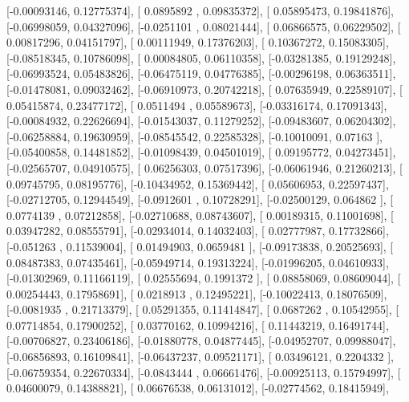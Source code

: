 \documentclass{article}
\begin{document}
       [-0.00093146,  0.12775374],
       [ 0.0895892 ,  0.09835372],
       [ 0.05895473,  0.19841876],
       [-0.06998059,  0.04327096],
       [-0.0251101 ,  0.08021444],
       [ 0.06866575,  0.06229502],
       [ 0.00817296,  0.04151797],
       [ 0.00111949,  0.17376203],
       [ 0.10367272,  0.15083305],
       [-0.08518345,  0.10786098],
       [ 0.00084805,  0.06110358],
       [-0.03281385,  0.19129248],
       [-0.06993524,  0.05483826],
       [-0.06475119,  0.04776385],
       [-0.00296198,  0.06363511],
       [-0.01478081,  0.09032462],
       [-0.06910973,  0.20742218],
       [ 0.07635949,  0.22589107],
       [ 0.05415874,  0.23477172],
       [ 0.0511494 ,  0.05589673],
       [-0.03316174,  0.17091343],
       [-0.00084932,  0.22626694],
       [-0.01543037,  0.11279252],
       [-0.09483607,  0.06204302],
       [-0.06258884,  0.19630959],
       [-0.08545542,  0.22585328],
       [-0.10010091,  0.07163   ],
       [-0.05400858,  0.14481852],
       [-0.01098439,  0.04501019],
       [ 0.09195772,  0.04273451],
       [-0.02565707,  0.04910575],
       [ 0.06256303,  0.07517396],
       [-0.06061946,  0.21260213],
       [ 0.09745795,  0.08195776],
       [-0.10434952,  0.15369442],
       [ 0.05606953,  0.22597437],
       [-0.02712705,  0.12944549],
       [-0.0912601 ,  0.10728291],
       [-0.02500129,  0.064862  ],
       [ 0.0774139 ,  0.07212858],
       [-0.02710688,  0.08743607],
       [ 0.00189315,  0.11001698],
       [ 0.03947282,  0.08555791],
       [-0.02934014,  0.14032403],
       [ 0.02777987,  0.17732866],
       [-0.051263  ,  0.11539004],
       [ 0.01494903,  0.0659481 ],
       [-0.09173838,  0.20525693],
       [ 0.08487383,  0.07435461],
       [-0.05949714,  0.19313224],
       [-0.01996205,  0.04610933],
       [-0.01302969,  0.11166119],
       [ 0.02555694,  0.1991372 ],
       [ 0.08858069,  0.08609044],
       [ 0.00254443,  0.17958691],
       [ 0.0218913 ,  0.12495221],
       [-0.10022413,  0.18076509],
       [-0.0081935 ,  0.21713379],
       [ 0.05291355,  0.11414847],
       [ 0.0687262 ,  0.10542955],
       [ 0.07714854,  0.17900252],
       [ 0.03770162,  0.10994216],
       [ 0.11443219,  0.16491744],
       [-0.00706827,  0.23406186],
       [-0.01880778,  0.04877445],
       [-0.04952707,  0.09988047],
       [-0.06856893,  0.16109841],
       [-0.06437237,  0.09521171],
       [ 0.03496121,  0.2204332 ],
       [-0.06759354,  0.22670334],
       [-0.0843444 ,  0.06661476],
       [-0.00925113,  0.15794997],
       [ 0.04600079,  0.14388821],
       [ 0.06676538,  0.06131012],
       [-0.02774562,  0.18415949],
\end{document}
